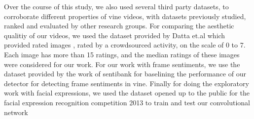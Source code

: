 Over the course of this study, we also used several third party datasets, to corroborate different properties of vine videos, with datasets previously studied, ranked and evaluated by other research groups. For comparing the aesthetic qualitiy of our videos, we used the dataset provided by Datta et.al \cite{datta2008algorithmic} which provided rated images , rated by a crowdsourced activity, on the scale of 0 to 7. Each image has more than 15 ratings, and the median ratings of these images were considered for our work. 
For our work with frame sentiments, we use the dataset provided by the work of sentibank \cite{jou2015visual} \cite{SentiBank} for baselining the performance of our detector for detecting frame sentiments in vine. Finally for doing the exploratory work with facial expressions, we used the dataset opened up to the public for the facial expression recognition competition 2013 \cite{goodfellow2013challenges} to train and test our convolutional network